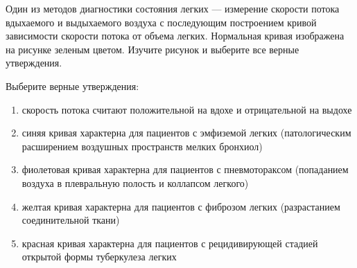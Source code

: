 
Один из методов
диагностики состояния легких — измерение скорости потока вдыхаемого и
выдыхаемого воздуха с последующим построением кривой зависимости скорости
потока от объема легких. Нормальная кривая изображена на рисунке зеленым
цветом. Изучите рисунок и выберите все верные утверждения.


Выберите верные утверждения:

\begin{enumerate}
    \item скорость потока считают положительной на вдохе и отрицательной на выдохе
    \item синяя кривая характерна для пациентов с эмфиземой легких (патологическим расширением воздушных пространств мелких бронхиол)
    \item фиолетовая кривая характерна для пациентов с пневмотораксом (попаданием воздуха в плевральную полость и коллапсом легкого)
    \item желтая кривая характерна для пациентов с фиброзом легких (разрастанием соединительной ткани)
    \item красная кривая характерна для пациентов с рецидивирующей стадией открытой формы туберкулеза легких
\end{enumerate}



